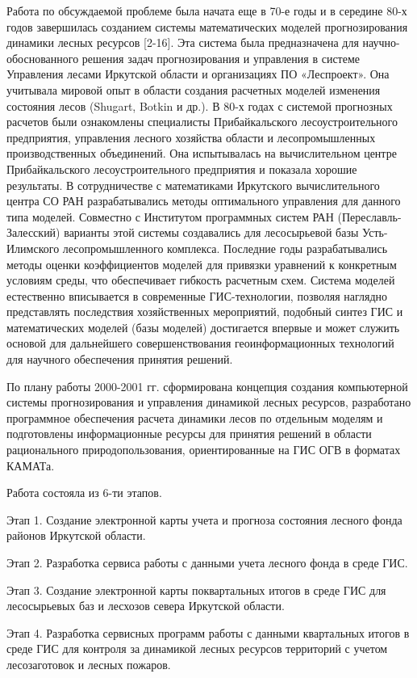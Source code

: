 \documentclass{report}
\begin{document}
Работа по обсуждаемой проблеме была начата еще в 70-е годы и в середине 80-х годов завершилась созданием системы
математических моделей прогнозирования динамики лесных ресурсов [2-16]. Эта система была предназначена для
научно-обоснованного решения задач прогнозирования и управления в системе Управления лесами Иркутской области и
организациях ПО «Леспроект». Она учитывала мировой опыт в области создания расчетных моделей изменения состояния лесов
(Shugart, Botkin и др.). В 80-х годах с системой прогнозных расчетов были ознакомлены специалисты Прибайкальского
лесоустроительного предприятия, управления лесного хозяйства области и лесопромышленных производственных объединений.
Она испытывалась на вычислительном центре Прибайкальского лесоустроительного предприятия и показала хорошие результаты.
В сотрудничестве с математиками Иркутского вычислительного центра СО РАН разрабатывались методы оптимального управления
для данного типа моделей. Совместно с Институтом программных систем РАН (Переславль-Залесский) варианты этой системы
создавались для лесосырьевой базы Усть-Илимского лесопромышленного комплекса. Последние годы разрабатывались методы
оценки коэффициентов моделей для привязки уравнений к конкретным условиям среды, что обеспечивает гибкость расчетным
схем. Система моделей естественно вписывается в современные ГИС-технологии, позволяя наглядно представлять последствия
хозяйственных мероприятий, подобный синтез ГИС и математических моделей (базы моделей) достигается впервые и может
служить основой для дальнейшего совершенствования геоинформационных технологий для научного обеспечения принятия
решений.

По плану работы  2000-2001 гг. сформирована концепция создания компьютерной системы прогнозирования и управления
динамикой лесных ресурсов, разработано программное обеспечения расчета динамики лесов по отдельным моделям и
подготовлены информационные ресурсы для принятия решений в области рационального природопользования, ориентированные на
ГИС ОГВ в форматах КАМАТа. 

Работа состояла из 6-ти этапов.  

Этап 1. Создание электронной карты учета и прогноза состояния лесного фонда районов Иркутской области.  

Этап 2. Разработка сервиса работы с данными учета лесного фонда в среде ГИС. 

Этап 3. Создание электронной карты поквартальных итогов в среде ГИС для лесосырьевых баз и лесхозов севера Иркутской
области.  

Этап 4. Разработка сервисных программ работы с данными квартальных итогов в среде ГИС для контроля за динамикой лесных
ресурсов территорий с учетом лесозаготовок и лесных пожаров. 
\end{document}
